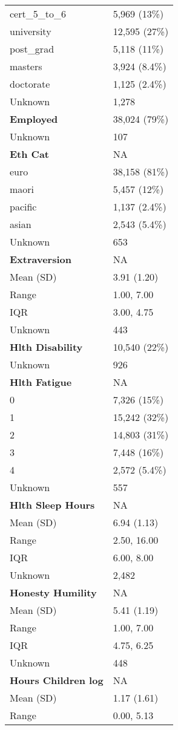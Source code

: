 \documentclass[
  singlecolumn]{article}
\begin{document}
\begin{longtable}[]{@{}ll@{}}
cert\_5\_to\_6 & 5,969 (13\%) \\
university & 12,595 (27\%) \\
post\_grad & 5,118 (11\%) \\
masters & 3,924 (8.4\%) \\
doctorate & 1,125 (2.4\%) \\
Unknown & 1,278 \\
\textbf{Employed} & 38,024 (79\%) \\
Unknown & 107 \\
\textbf{Eth Cat} & NA \\
euro & 38,158 (81\%) \\
maori & 5,457 (12\%) \\
pacific & 1,137 (2.4\%) \\
asian & 2,543 (5.4\%) \\
Unknown & 653 \\
\textbf{Extraversion} & NA \\
Mean (SD) & 3.91 (1.20) \\
Range & 1.00, 7.00 \\
IQR & 3.00, 4.75 \\
Unknown & 443 \\
\textbf{Hlth Disability} & 10,540 (22\%) \\
Unknown & 926 \\
\textbf{Hlth Fatigue} & NA \\
0 & 7,326 (15\%) \\
1 & 15,242 (32\%) \\
2 & 14,803 (31\%) \\
3 & 7,448 (16\%) \\
4 & 2,572 (5.4\%) \\
Unknown & 557 \\
\textbf{Hlth Sleep Hours} & NA \\
Mean (SD) & 6.94 (1.13) \\
Range & 2.50, 16.00 \\
IQR & 6.00, 8.00 \\
Unknown & 2,482 \\
\textbf{Honesty Humility} & NA \\
Mean (SD) & 5.41 (1.19) \\
Range & 1.00, 7.00 \\
IQR & 4.75, 6.25 \\
Unknown & 448 \\
\textbf{Hours Children log} & NA \\
Mean (SD) & 1.17 (1.61) \\
Range & 0.00, 5.13 \\

\end{longtable}
\end{document}
